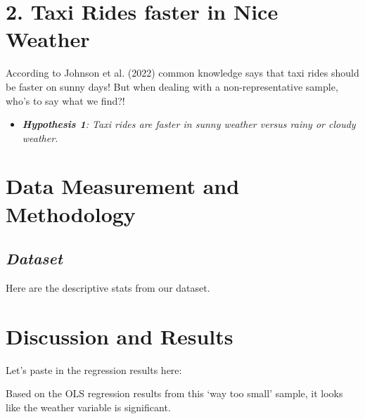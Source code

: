 \documentclass[11pt]{article}
\begin{document}
\section*{2. Taxi Rides faster in Nice Weather}

According to Johnson et al. (2022) common knowledge says that taxi rides should be faster on sunny days!  But when dealing with a non-representative sample, who's to say what we find?!

\begin{itemize}
\item[] \emph{{\bf Hypothesis 1}: Taxi rides are faster in sunny weather versus rainy or cloudy weather.} 
\end{itemize}

\section*{Data Measurement and Methodology}

 \subsection*{\emph{Dataset}}
Here are the descriptive stats from our dataset. 

\begin{center}

%
%
\end{center}

\section*{Discussion and Results}

Let's paste in the regression results here: 

\begin{center}

%
%
\end{center}

Based on the OLS regression results from this `way too small' sample, it looks like the weather variable is significant.  
\newpage
\end{document}
